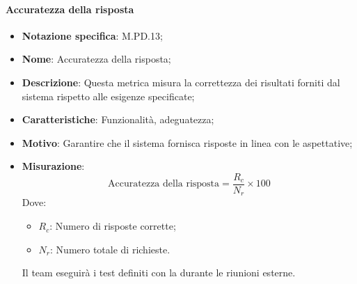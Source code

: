\paragraph*{Accuratezza della risposta}
\begin{itemize}
    \item \textbf{Notazione specifica}: M.PD.13;
    \item \textbf{Nome}: Accuratezza della risposta;
    \item \textbf{Descrizione}: Questa metrica misura la correttezza dei risultati forniti dal sistema rispetto alle esigenze specificate;
    \item \textbf{Caratteristiche}: Funzionalità, adeguatezza;
    \item \textbf{Motivo}: Garantire che il sistema fornisca risposte in linea con le aspettative;
    \item \textbf{Misurazione}:
    \[
    \text{Accuratezza della risposta} = \frac{R_{c}}{N_{r}} \times 100
    \]
    Dove:
    \begin{itemize}
        \item $R_{c}$: Numero di risposte corrette;
        \item $N_{r}$: Numero totale di richieste.
    \end{itemize}

    \vspace{0.5\baselineskip}
    \par Il team eseguirà i test definiti con la  durante le riunioni esterne.
 \end{itemize}
